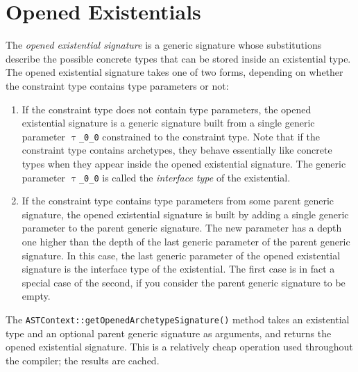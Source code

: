 \documentclass[a4paper,headsepline,bibliography=totoc,toc=flat,fleqn,twoside=semi]{scrbook}
\theoremstyle{definition}
\theoremstyle{definition}
\theoremstyle{definition}
\newcommand{\ttgp}[2]{\texttt{$\uptau$\_#1\_#2}}
\newcommand{\ifWIP}{\iffalse}
\begin{document}
\section{Opened Existentials}\label{open existential archetypes}

\ifWIP

The \emph{opened existential signature} is a generic signature whose substitutions describe the possible concrete types that can be stored inside an existential type. The opened existential signature takes one of two forms, depending on whether the constraint type contains type parameters or not:
\begin{enumerate}
\item
If the constraint type does not contain type parameters, the opened existential signature is a generic signature built from a single generic parameter \texttt{\ttgp{0}{0}} constrained to the constraint type. Note that if the constraint type contains archetypes, they behave essentially like concrete types when they appear inside the opened existential signature. The generic parameter \texttt{\ttgp{0}{0}} is called the \emph{interface type} of the existential.
\item
If the constraint type contains type parameters from some parent generic signature, the opened existential signature is built by adding a single generic parameter to the parent generic signature. The new parameter has a depth one higher than the depth of the last generic parameter of the parent generic signature. In this case, the last generic parameter of the opened existential signature is the interface type of the existential. The first case is in fact a special case of the second, if you consider the parent generic signature to be empty. 
\end{enumerate}
The \texttt{ASTContext::getOpenedArchetypeSignature()} method takes an existential type and an optional parent generic signature as arguments, and returns the opened existential signature. This is a relatively cheap operation used throughout the compiler; the results are cached.
\end{document}
